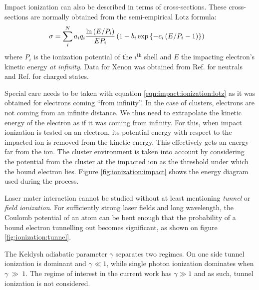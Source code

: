 Impact ionization can also be described in terms of cross-sections. These
cross-sections are normally obtained from the semi-empirical Lotz
formula\cite{Lotz1967}:
\begin{align}
\sigma & = \sum_{i}^{N} a_i q_i \frac{\ln{\left( E/P_i \right)}}{E P_i} \left( 1 - b_i
\exp{ \left\{ -c_i \left( E/P_i - 1 \right) \right\}} \right)
\label{eqn:impact:ionization:lotz}
\end{align}
where $P_i$ is the ionization potential of the $i^{\textrm{th}}$ shell and $E$
the impacting electron's kinetic energy \textit{at infinity}.
Data for Xenon was obtained from Ref. \cite{Tawara1987} for neutrals
and Ref. \cite{Heidenreich2005} for charged states.

Special care needs to be taken with equation \eqref{eqn:impact:ionization:lotz}
as it was obtained for electrons coming ``from infinity''. In the case of
clusters, electrons are not coming from an infinite distance. We thus need to
extrapolate the kinetic energy of the electron as if it was coming from
infinity. For this, when impact ionization is tested on an electron, its
potential energy with respect to the impacted ion is removed from the kinetic
energy. This effectively gets an energy far from the ion. The cluster
environment is taken into account by considering the potential from the cluster
at the impacted ion as the threshold under which the bound electron lies.
Figure \ref{fig:ionization:impact} shows the energy diagram used during the
process.



Laser mater interaction cannot be studied without at least mentioning
\textit{tunnel} or \textit{field ionization}. For sufficiently strong laser
fields and long wavelength, the Coulomb potential of an atom can be bent enough
that the probability of a bound electron tunnelling out becomes significant, as
shown on figure \ref{fig:ionization:tunnel}.


The Keldysh adiabatic parameter $\gamma$ separates two regimes\cite{Fennel2010}.
On one side tunnel ionization is dominant and $\gamma \ll 1$, while single
photon ionization dominates when $\gamma~\gg~1$. The regime of interest in the
current work has $\gamma \gg 1$ and as such, tunnel ionization is not
considered.


